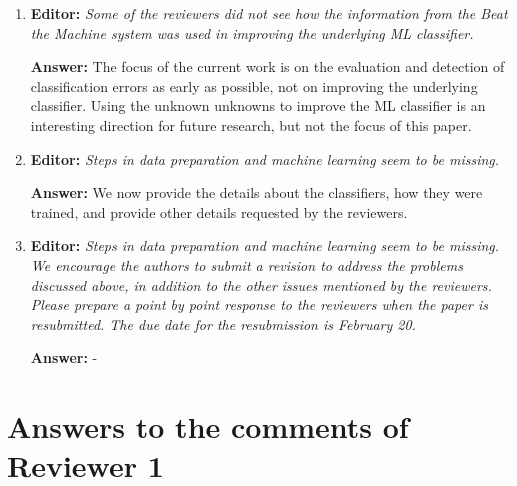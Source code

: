 \documentclass[letterpaper]{article}
\begin{document}
\begin{enumerate}
\item \textbf{Editor:}  \emph{Some of the reviewers did not see how the information from the Beat the Machine system was used in improving the underlying ML classifier.}

\textbf{Answer:} The focus of the current work is on the evaluation and detection of classification errors as early as possible, not on improving the underlying classifier. Using the unknown unknowns to improve the ML classifier is an interesting direction for future research, but not the focus of this paper.

\item \textbf{Editor:}  \emph{Steps in data preparation and machine learning seem to be missing.}

\textbf{Answer:} We now provide the details about the classifiers, how they were trained, and provide other details requested by the reviewers.

\item \textbf{Editor:}  \emph{Steps in data preparation and machine learning seem to be missing. We encourage the authors to submit a revision to address the problems discussed above, in addition to the other issues mentioned by the reviewers. Please prepare a point by point response to the reviewers when the paper is resubmitted. The due date for the resubmission is February 20.}

\textbf{Answer:} -



\end{enumerate}




\section{Answers to the comments of Reviewer 1} \label{sec:reviewer1}
\end{document}
